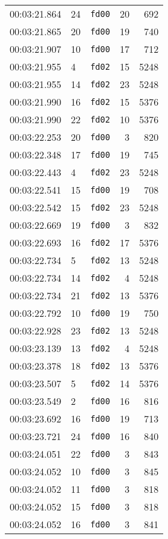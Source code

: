 \documentclass{article}
\begin{document}
\begin{longtable}{lllrr}
00:03:21.864 & 24 & \texttt{fd00} & 20 & 692 \\
00:03:21.865 & 20 & \texttt{fd00} & 19 & 740 \\
00:03:21.907 & 10 & \texttt{fd00} & 17 & 712 \\
00:03:21.955 & 4 & \texttt{fd02} & 15 & 5248 \\
00:03:21.955 & 14 & \texttt{fd02} & 23 & 5248 \\
00:03:21.990 & 16 & \texttt{fd02} & 15 & 5376 \\
00:03:21.990 & 22 & \texttt{fd02} & 10 & 5376 \\
00:03:22.253 & 20 & \texttt{fd00} & 3 & 820 \\
00:03:22.348 & 17 & \texttt{fd00} & 19 & 745 \\
00:03:22.443 & 4 & \texttt{fd02} & 23 & 5248 \\
00:03:22.541 & 15 & \texttt{fd00} & 19 & 708 \\
00:03:22.542 & 15 & \texttt{fd02} & 23 & 5248 \\
00:03:22.669 & 19 & \texttt{fd00} & 3 & 832 \\
00:03:22.693 & 16 & \texttt{fd02} & 17 & 5376 \\
00:03:22.734 & 5 & \texttt{fd02} & 13 & 5248 \\
00:03:22.734 & 14 & \texttt{fd02} & 4 & 5248 \\
00:03:22.734 & 21 & \texttt{fd02} & 13 & 5376 \\
00:03:22.792 & 10 & \texttt{fd00} & 19 & 750 \\
00:03:22.928 & 23 & \texttt{fd02} & 13 & 5248 \\
00:03:23.139 & 13 & \texttt{fd02} & 4 & 5248 \\
00:03:23.378 & 18 & \texttt{fd02} & 13 & 5376 \\
00:03:23.507 & 5 & \texttt{fd02} & 14 & 5376 \\
00:03:23.549 & 2 & \texttt{fd00} & 16 & 816 \\
00:03:23.692 & 16 & \texttt{fd00} & 19 & 713 \\
00:03:23.721 & 24 & \texttt{fd00} & 16 & 840 \\
00:03:24.051 & 22 & \texttt{fd00} & 3 & 843 \\
00:03:24.052 & 10 & \texttt{fd00} & 3 & 845 \\
00:03:24.052 & 11 & \texttt{fd00} & 3 & 818 \\
00:03:24.052 & 15 & \texttt{fd00} & 3 & 818 \\
00:03:24.052 & 16 & \texttt{fd00} & 3 & 841 \\

\end{longtable}
\end{document}
